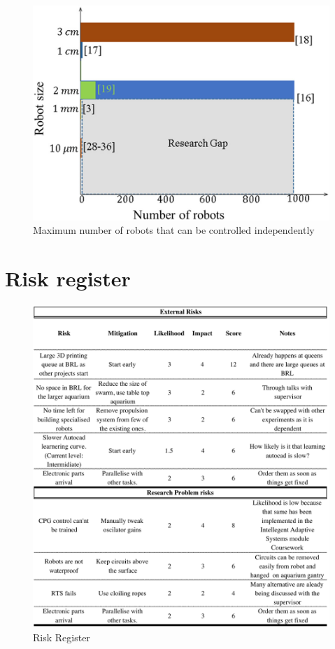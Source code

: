 \documentclass[11pt,a4paper]{article}
\begin{document}
\begin{multicols}{2}
\begin{figure}[H]
\includegraphics{images/figure_research_gap.pdf}
\caption{Maximum number of robots that can be controlled independently\cite{chowdhury2015controlling}}
\end{figure}
\end{multicols}

\newpage
\section{Risk register}\label{Rregister}
\begin{figure}[htbp]
\includegraphics{images/risk.pdf}
\caption{Risk Register}
\end{figure}
\newpage
\end{document}
